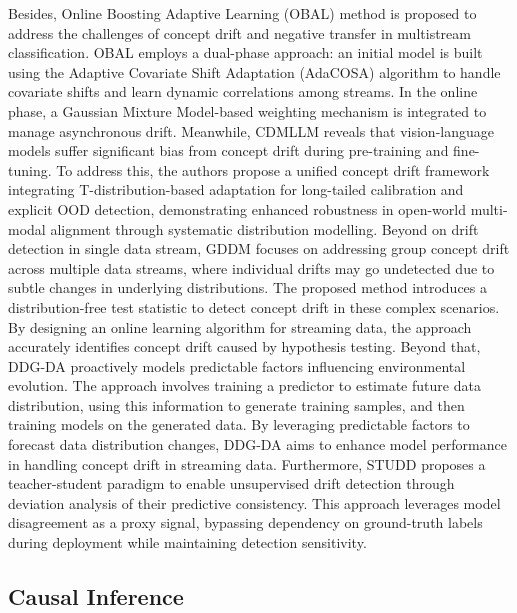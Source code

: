 Besides, Online Boosting Adaptive Learning (OBAL) method \cite{yu2024online} is proposed to address the challenges of concept drift and negative transfer in multistream classification. OBAL employs a dual-phase approach: an initial model is built using the Adaptive Covariate Shift Adaptation (AdaCOSA) algorithm to handle covariate shifts and learn dynamic correlations among streams. In the online phase, a Gaussian Mixture Model-based weighting mechanism is integrated to manage asynchronous drift. Meanwhile, CDMLLM \cite{yang2024adaptingmultimodallargelanguage} reveals that vision-language models suffer significant bias from concept drift during pre-training and fine-tuning. To address this, the authors propose a unified concept drift framework integrating T-distribution-based adaptation for long-tailed calibration and explicit OOD detection, demonstrating enhanced robustness in open-world multi-modal alignment through systematic distribution modelling. Beyond on drift detection in single data stream, GDDM \cite{yuDetectingGroupConcept2023} focuses on addressing group concept drift across multiple data streams, where individual drifts may go undetected due to subtle changes in underlying distributions. The proposed method introduces a distribution-free test statistic to detect concept drift in these complex scenarios. By designing an online learning algorithm for streaming data, the approach accurately identifies concept drift caused by hypothesis testing. Beyond that, DDG-DA \cite{liDDGDataDistributionGeneration2022} proactively models predictable factors influencing environmental evolution. The approach involves training a predictor to estimate future data distribution, using this information to generate training samples, and then training models on the generated data. By leveraging predictable factors to forecast data distribution changes, DDG-DA aims to enhance model performance in handling concept drift in streaming data. Furthermore, STUDD\cite{cerqueiraSTUDDStudentTeacher2023} proposes a teacher-student paradigm to enable unsupervised drift detection through deviation analysis of their predictive consistency. This approach leverages model disagreement as a proxy signal, bypassing dependency on ground-truth labels during deployment while maintaining detection sensitivity.

\subsection{Causal Inference}

